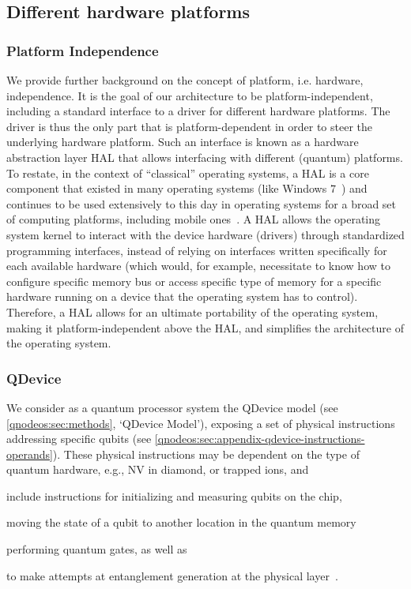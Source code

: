 \subsection{Different hardware platforms} 

\subsubsection{Platform Independence}

We provide further background on the concept of platform, i.e. hardware, independence. It is the goal of our architecture to be platform-independent, including a standard interface to a driver for different hardware platforms. The driver is thus the only part that is platform-dependent in order to steer the underlying hardware platform. Such an interface is known as a hardware abstraction layer \ac{HAL} that allows interfacing with different (quantum) platforms. To restate, in the context of ``classical'' operating systems, a \ac{HAL} is a core component that existed in many operating systems (like Windows 7~\cite[Section 19.3.1]{silberschatz_book_2014}) and continues to be used extensively to this day in operating systems for a broad set of computing platforms, including mobile ones~\cite{android_hal}. A \ac{HAL} allows the operating system kernel to interact with the device hardware (drivers) through standardized programming interfaces, instead of relying on interfaces written specifically for each available hardware (which would, for example, necessitate to know how to configure specific memory bus or access specific type of memory for a specific hardware running on a device that the operating system has to control). Therefore, a \ac{HAL} allows for an ultimate portability of the operating system, making it platform-independent above the \ac{HAL}, and simplifies the architecture of the operating system. 

\subsubsection{QDevice}
We consider as a quantum processor system the \ac{QDevice} model (see \cref{qnodeos:sec:methods}, `QDevice Model'), exposing a set of physical instructions addressing specific qubits (see \cref{qnodeos:sec:appendix-qdevice-instructions-operands}). These physical instructions may be dependent on the type of quantum hardware, e.g., \ac{NV} in diamond, or trapped ions, and
%
\begin{inlinelist}
\item include instructions for initializing and measuring qubits on the chip,
\item moving the state of a qubit to another location in the quantum memory
\item performing quantum gates, as well as
\item to make attempts at entanglement generation at the physical layer~\cite{pompili_2022_experimental}.
\end{inlinelist}

